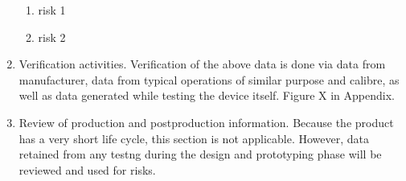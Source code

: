 \documentclass{article}[10pt]
\begin{document}
\begin{enumerate}
\begin{enumerate}
        \item risk 1
        \item risk 2
    \end{enumerate}
    \item Verification activities.
    Verification of the above data is done via data from manufacturer, data from typical operations of similar purpose and calibre, as well as data generated while testing the device itself.
    Figure X in Appendix.
    \item Review of production and postproduction information.
    Because the product has a very short life cycle, this section is not applicable. However, data retained from any testng during the design and
    prototyping phase will be reviewed and used for risks.



\end{enumerate}    
\end{document}
